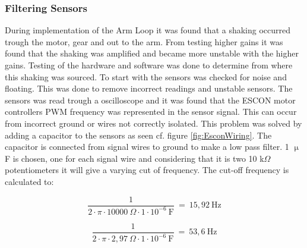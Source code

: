 \subsubsection{Filtering Sensors}
During implementation of the Arm Loop it was found that a shaking occurred trough the motor, gear and out to the arm. From testing higher gains it was found that the shaking was amplified and became more unstable with the higher gains. Testing of the hardware and software was done to determine from where this shaking was sourced. To start with the sensors was checked for noise and floating. This was done to remove incorrect readings and unstable sensors. The sensors was read trough a oscilloscope and it was found that the ESCON motor controllers PWM frequency was represented in the sensor signal. This can occur from incorrect ground or wires not correctly isolated. This problem was solved by adding a capacitor to the sensors as seen cf. figure \ref{fig:EsconWiring}. The capacitor is connected from signal wires to ground to make a low pass filter. 1 $\upmu$F is chosen, one for each signal wire and considering that it is two 10 k$\Omega$ potentiometers it will give a varying cut of frequency. The cut-off frequency is calculated to:       

\begin{equation}
\frac{1}{2\cdot \pi \cdot 10000\ \Omega \cdot 1 \cdot 10^{-6}\  \text{F}}\ =\ 15,92\ \text{Hz}
\end{equation}

\begin{equation}
\frac{1}{2\cdot \pi \cdot 2,97\ \Omega \cdot 1 \cdot 10^{-6}\  \text{F}}\ =\ 53,6\ \text{Hz}
\end{equation}

